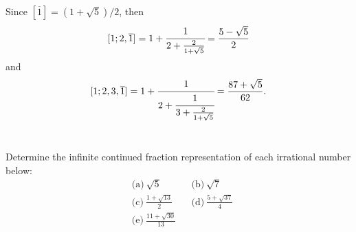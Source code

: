 \begin{solution}
    Since $[\overline{1}] = (1 + \sqrt{5})/2$, then
    $$[1; 2, \overline{1}] = 1 + \cfrac{1}{2 + \frac{2}{1 + \sqrt{5}}} = \frac{5 - \sqrt{5}}{2}$$
    and
    $$[1; 2, 3, \overline{1}] = 1 + \cfrac{1}{2 + \cfrac{1}{3 + \frac{2}{1 + \sqrt{5}}}} = \frac{87 + \sqrt{5}}{62}.$$ \\
\end{solution}

\begin{exercise}
    Determine the infinite continued fraction representation of each irrational number below:
    \begin{align*}
        &\text{(a)} \ \sqrt{5} & &\text{(b)} \ \sqrt{7} \\
        &\text{(c)} \ \frac{1 + \sqrt{13}}{2} & &\text{(d)} \ \frac{5 + \sqrt{37}}{4} \\
        &\text{(e)} \ \frac{11 + \sqrt{30}}{13} & &
    \end{align*} 
\end{exercise}

